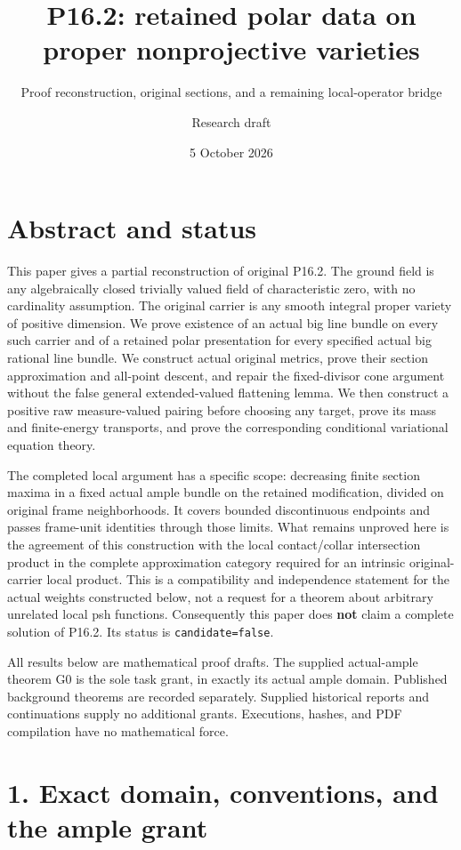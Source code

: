 \documentclass[
  10pt,
]{article}
\title{P16.2: retained polar data on proper nonprojective varieties}
\subtitle{Proof reconstruction, original sections, and a remaining
local-operator bridge}
\author{Research draft}
\date{5 October 2026}
\begin{document}
\maketitle

\section{Abstract and status}\label{abstract-and-status}

This paper gives a partial reconstruction of original P16.2. The ground
field is any algebraically closed trivially valued field of
characteristic zero, with no cardinality assumption. The original
carrier is any smooth integral proper variety of positive dimension. We
prove existence of an actual big line bundle on every such carrier and
of a retained polar presentation for every specified actual big rational
line bundle. We construct actual original metrics, prove their section
approximation and all-point descent, and repair the fixed-divisor cone
argument without the false general extended-valued flattening lemma. We
then construct a positive raw measure-valued pairing before choosing any
target, prove its mass and finite-energy transports, and prove the
corresponding conditional variational equation theory.

The completed local argument has a specific scope: decreasing finite
section maxima in a fixed actual ample bundle on the retained
modification, divided on original frame neighborhoods. It covers bounded
discontinuous endpoints and passes frame-unit identities through those
limits. What remains unproved here is the agreement of this construction
with the local contact/collar intersection product in the complete
approximation category required for an intrinsic original-carrier local
product. This is a compatibility and independence statement for the
actual weights constructed below, not a request for a theorem about
arbitrary unrelated local psh functions. Consequently this paper does
\textbf{not} claim a complete solution of P16.2. Its status is
\texttt{candidate=false}.

All results below are mathematical proof drafts. The supplied
actual-ample theorem G0 is the sole task grant, in exactly its actual
ample domain. Published background theorems are recorded separately.
Supplied historical reports and continuations supply no additional
grants. Executions, hashes, and PDF compilation have no mathematical
force.

\section{1. Exact domain, conventions, and the ample
grant}\label{exact-domain-conventions-and-the-ample-grant}
\end{document}
